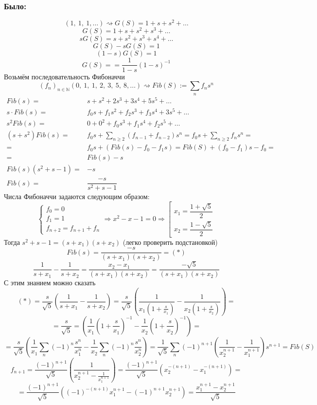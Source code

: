 \documentclass[12pt, letterpaper, twoside]{article}
\newcommand{\mb}[1]{\mathbb{#1}}
\begin{document}
    \subsubsection*{Было:}
    \[(1,\ 1,\ 1,\dots) \rightsquigarrow G(S) = 1 + s + s^2 + \dots\]
    \[G(S) = 1 + s + s^2 + s^3 + \dots\]
    \[sG(S) = s + s^2 + s^3 + s^4 +\dots\]
    \[G(S) - sG(S) = 1\]
    \[(1 - s)G(S) = 1\]
    \[G(S) = = \dfrac{1}{1 - s} (1 - s)^{-1}\]
    Возьмём последовательность Фибоначчи
    \[(f_n)_{n\in\mb{N}}(0,\ 1,\ 1,\ 2,\ 3,\ 5,\ 8,\dots)\rightsquigarrow Fib(S) := \sum\limits_n f_n s^n\]
    \begin{align*}
        Fib(s) =& s + s^2 + 2s^3 + 3s^4 + 5s^5 + \dots\\
        s\cdot Fib(s) =& f_0 s + f_1s^2 + f_2s^3 + f_3s^4 + 3s^5 +\dots\\
        s^2 Fib(s) =& 0 + 0^2 + f_0s^3 + f_1s^4 + f_2s^5 + \dots\\
        (s + s^2) Fib(s) =& f_0 s + \sum_{n\geq 2} (f_{n - 1} + f_{n - 2})s^n = f_0s + \sum_{n \geq 2} f_n s^n =\\
        =& f_0 s + (Fib(s) - f_0 - f_1 s) = Fib(S) + (f_0 - f_1)s - f_0 =\\
        =& Fib(s) - s\\
        Fib(s)(s^2 + s - 1) =& -s\\
        Fib(s) =& \dfrac{-s}{s^2 + s - 1}
    \end{align*}
    Числа Фибоначчи задаются следующим образом:
    \[\begin{cases}
        f_0 = 0\\
        f_1 = 1\\
        f_{n + 2} = f_{n + 1} + f_n
    \end{cases}\Rightarrow x^2 - x - 1 = 0\Rightarrow \left[ \begin{gathered}
        x_1 = \dfrac{1 + \sqrt{5}}{2}\\
        x_2 = \dfrac{1 - \sqrt{5}}{2}
    \end{gathered} \right.\]
    Тогда $s^2 + s - 1 = (s + x_1)(s + x_2)$ (легко проверить подстановкой)
    \[Fib(s) = \frac{-s}{(s + x_1)(s + x_2)} = (*)\]
    \[ \frac{1}{s + x_1} - \frac{1}{s + x_2} = \frac{x_2 - x_1}{(s + x_1)(s + x_2)} = \frac{-\sqrt{5}}{(s + x_1)(s + x_2)}\]
    С этим знанием можно сказать
    \[(*) = \frac{s}{\sqrt{5}} \left( \frac{1}{s + x_1} - \frac{1}{s + x_2} \right) = \frac{s}{\sqrt{5}}\left( \frac{1}{x_1(1 + \frac{s}{x_1})} - \frac{1}{x_2(1 + \frac{s}{x_2})} \right)=\]
    \[=\frac{s}{\sqrt{5}} = \left( \frac{1}{x_1}\left( 1 + \frac{s}{x_1} \right)^{-1} - \frac{1}{x_2}\left( 1 + \frac{s}{x_2} \right)^{-1} \right)=\]
    \[=\frac{s}{\sqrt{5}}\left(\frac{1}{x_1}\sum_{n} (-1)^n \frac{s^n}{x_1^n} - \frac{1}{x_2}\sum_{n} (-1)^n \frac{s^n}{x_2^n}  \right) = \frac{1}{\sqrt{5}} \sum_{n} (-1)^{n+1}\left( \frac{1}{x_2^{n + 1}} - \frac{1}{x_1^{n + 1}} \right) s^{n + 1}= Fib(S)\]\newpage
    \[f_{n + 1} = \frac{(-1)^{n + 1}}{\sqrt{5}}\left( \frac{1}{x_2^{n + 1}  - \frac{1}{x_1^{n + 1}}}\right) = \frac{(-1)^{n + 1}}{\sqrt{5}}\left( x_2^{-(n + 1)} - x_1^{-(n + 1)} \right) =\]
    \[= \frac{(-1)^{n + 1}}{\sqrt{5}}\left( (-1)^{-(n + 1)}x_1^{n + 1} - (-1)^{n + 1}x_2^{n + 1} \right) = \frac{x_1^{n + 1} - x_2^{n + 1}}{\sqrt{5}}\]
\end{document}

